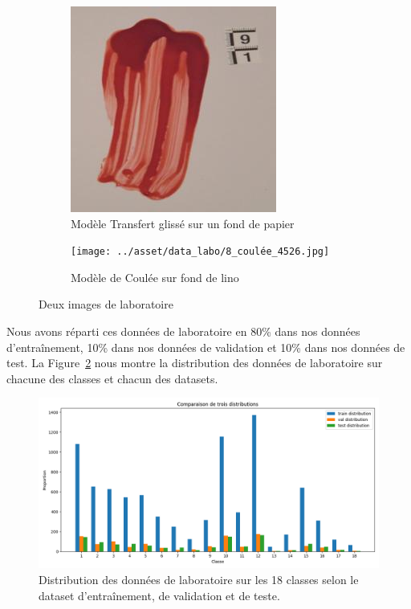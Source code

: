 \documentclass[a4paper]{article}
\begin{document}
\begin{figure}[H]
    \centering
    \begin{subfigure}{0.40\linewidth}
        \centering
        \includegraphics[width=\linewidth]{../asset/data_labo/4_papier_1586.jpg}
        \caption{Modèle Transfert glissé sur un fond de papier}
    \end{subfigure}
    \begin{subfigure}{0.40\linewidth}
        \centering
        \texttt{[image: ../asset/data\_labo/8\_coulée\_4526.jpg]}
        \caption{Modèle de Coulée sur fond de lino}
    \end{subfigure}
    \caption{Deux images de laboratoire}
    \label{fig: labs images}
\end{figure}

Nous avons réparti ces données de laboratoire en 80\% dans nos données d'entraînement, 10\% dans nos données de validation et 10\% dans nos données de test. La Figure~\ref{fig:distribution labo} nous montre la distribution des données de laboratoire sur chacune des classes et chacun des datasets.

\begin{figure}[H]
    \centering
    \includegraphics[width=0.8\linewidth]{../asset/distribution_train_val_test.png}
    \caption{Distribution des données de laboratoire sur les 18 classes selon le dataset d'entraînement, de validation et de teste.}
    \label{fig:distribution labo}
\end{figure}
\end{document}
